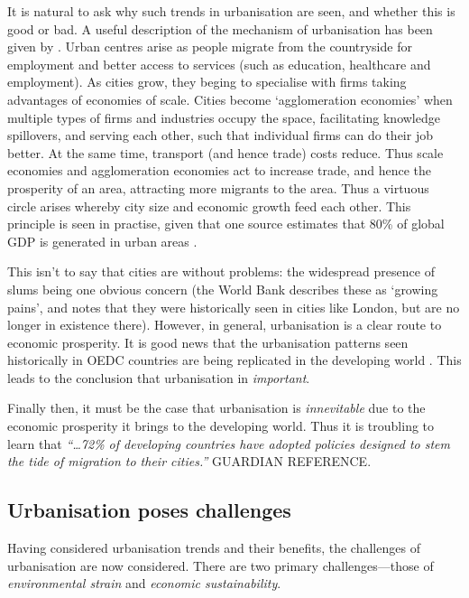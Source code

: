 It is natural to ask why such trends in urbanisation are seen, and whether this is good or bad. A useful description of the mechanism of urbanisation has been given by \citet{WorldBank2008a}. Urban centres arise as people migrate from the countryside for employment and better access to services (such as education, healthcare and employment). As cities grow, they beging to specialise with firms taking advantages of economies of scale. Cities become `agglomeration economies' when multiple types of firms and industries occupy the space, facilitating knowledge spillovers, and serving each other, such that individual firms can do their job better. At the same time, transport (and hence trade) costs reduce. Thus scale economies and agglomeration economies act to increase trade, and hence the prosperity of an area, attracting more migrants to the area. Thus a virtuous circle arises whereby city size and economic growth feed each other. This principle is seen in practise, given that one source estimates that 80\% of global GDP is generated in urban areas \citep{AREAS2012}.

This isn't to say that cities are without problems: the widespread presence of slums being one obvious concern (the World Bank describes these as `growing pains', and notes that they were historically seen in cities like London, but are no longer in existence there). However, in general, urbanisation is a clear route to economic prosperity. It is good news that the urbanisation patterns seen historically in OEDC countries are being replicated in the developing world \citep{WorldBank2008a}. This leads to the conclusion that urbanisation in \emph{important}.

Finally then, it must be the case that urbanisation is \emph{innevitable} due to the economic prosperity it brings to the developing world. Thus it is troubling to learn that \emph{``\ldots 72\% of developing countries have adopted policies designed to stem the tide of migration to their cities.''} GUARDIAN REFERENCE.

\subsection{Urbanisation poses challenges}
Having considered urbanisation trends and their benefits, the challenges of urbanisation are now considered. There are two primary challenges---those of \emph{environmental strain} and \emph{economic sustainability}.


